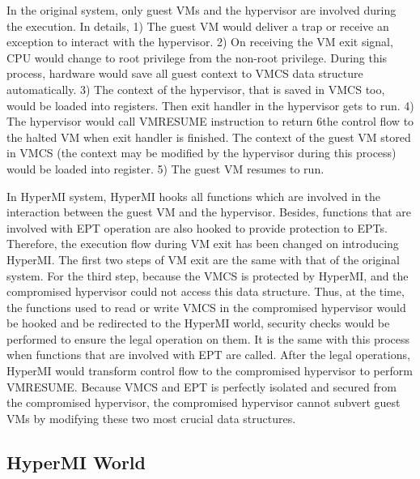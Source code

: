 \documentclass[conference]{IEEEtran}
\begin{document}
In the original system, only guest VMs and the hypervisor are involved during the execution. In details, 1) The guest VM would deliver a trap or receive an exception to interact with the hypervisor. 2) On receiving the VM exit signal, CPU would change to root privilege from the non-root privilege. During this process, hardware would save all guest context to VMCS data structure automatically. 3) The context of the hypervisor, that is saved in VMCS too, would be loaded into registers. Then exit handler in the hypervisor gets to run. 4) The hypervisor would call VMRESUME instruction to return 6the control flow to the halted VM when exit handler is finished. The context of the guest VM stored in VMCS (the context may be modified by the hypervisor during this process) would be loaded into register. 5) The guest VM resumes to run.

In HyperMI system, HyperMI hooks all functions which are involved in the interaction between the guest VM and the hypervisor. Besides, functions that are involved with EPT operation are also hooked to provide protection to EPTs. Therefore, the execution flow during VM exit has been changed on introducing HyperMI. The first two steps of VM exit are the same with that of the original system. For the third step, because the VMCS is protected by HyperMI, and the compromised hypervisor could not access this data structure. Thus, at the time, the functions used to read or write VMCS in the compromised hypervisor would be hooked and be redirected to the HyperMI world, security checks would be performed to ensure the legal operation on them. It is the same with this process when functions that are involved with EPT are called. 
After the legal operations, HyperMI would transform control flow to the compromised hypervisor to perform VMRESUME. Because VMCS and EPT is perfectly isolated and secured from the compromised hypervisor, the compromised hypervisor cannot subvert guest VMs by modifying these two most crucial data structures.

\fi




\subsection{HyperMI World} \label {HWorld}
\end{document}
